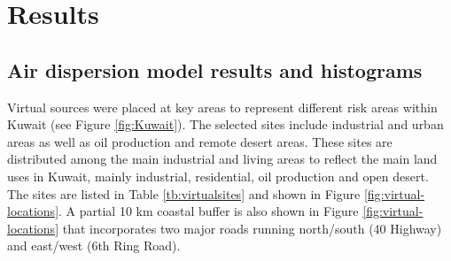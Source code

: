 \section{Results}

\subsection{Air dispersion model results and histograms}

Virtual sources were placed at key areas to represent different risk areas within Kuwait (see Figure \ref{fig:Kuwait}).  The selected sites include industrial and urban areas as well as oil production and remote desert areas. These sites are distributed among the main industrial and living areas to reflect the main land uses in Kuwait, mainly industrial, residential, oil production and open desert.  The sites are listed in Table \ref{tb:virtualsites} and shown in Figure \ref{fig:virtual-locations}. A partial 10 km coastal buffer is also shown in Figure \ref{fig:virtual-locations} that incorporates two major roads running north/south (40 Highway) and east/west (6th Ring Road).
%
\begin{table}[H]
\centering
\caption{Virtual site locations.}
\label{tb:virtualsites}
\end{table}
